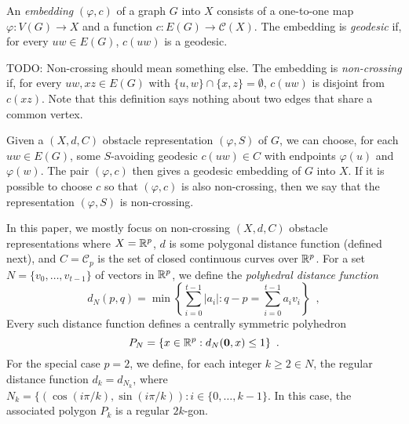 \documentclass{patmorin}
\begin{document}
An \emph{embedding} $(\varphi,c)$ of a graph $G$ into $X$ consists
of a one-to-one map $\varphi:V(G)\to X$ and a function $c: E(G)\to
\mathcal{C}(X)$.  The embedding is \emph{geodesic} if, for every $uw\in
E(G)$, $c(uw)$ is a geodesic.  

TODO: Non-crossing should mean something else.
The embedding is \emph{non-crossing} if,
for every $uw,xz\in E(G)$ with $\{u,w\}\cap \{x,z\}=\emptyset$, $c(uw)$
is disjoint from $c(xz)$.  Note that this definition says nothing about
two edges that share a common vertex.

Given a $(X,d,C)$ obstacle representation $(\varphi,S)$ of $G$, we can
choose, for each $uw\in E(G)$, some $S$-avoiding geodesic $c(uw)\in C$
with endpoints $\varphi(u)$ and $\varphi(w)$.  The pair $(\varphi,c)$
then gives a geodesic embedding of $G$ into $X$.  If it is possible to
choose $c$ so that $(\varphi,c)$ is also non-crossing, then we say that
the representation $(\varphi,S)$ is non-crossing.




In this paper, we mostly focus on non-crossing $(X,d,C)$ obstacle
representations where $X=\mathbb{R}^p$, $d$ is some polygonal distance function
(defined next), and $C=\mathcal{C}_p$ is the set of closed continuous
curves over $\mathbb{R}^p$.  For a set $N=\{v_0,\ldots,v_{t-1}\}$ of vectors in
$\mathbb{R}^p$, we define the \emph{polyhedral distance function}
\[  
   d_N(p,q)=\min\left\{\sum_{i=0}^{t-1}|a_i|: 
                        q-p=\sum_{i=0}^{t-1}a_iv_i\right\} \enspace ,
\]
Every such distance function defines a centrally symmetric polyhedron
\[
   P_N=\{x\in\mathbb{R}^p: d_N(\mathbf{0},x)\le 1\}  \enspace .
\]
For the special case $p=2$, we define, for each integer $k\ge 2 \in N$,
the regular distance function $d_k=d_{N_k}$, where $N_k=\{(\cos(i\pi/k),
\sin(i\pi/k)): i\in\{0,\ldots,k-1\}$.  In this case, the associated
polygon $P_k$ is a regular $2k$-gon.
\end{document}
